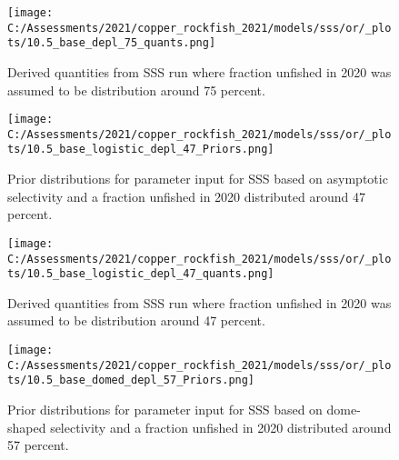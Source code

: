 \documentclass[11pt,
  english,
  a4paper,
]{article}
\begin{document}
\tagmcend\tagstructend

\newpage


\begin{figure}
\centering
\texttt{[image: C:/Assessments/2021/copper\_rockfish\_2021/models/sss/or/\_plots/10.5\_base\_depl\_75\_quants.png]}
\caption{Derived quantities from SSS run where fraction unfished in 2020 was assumed to be distribution around 75 percent.\label{fig:sss-quant-75}}
\end{figure}

\tagmcend\tagstructend

\newpage


\begin{figure}
\centering
\texttt{[image: C:/Assessments/2021/copper\_rockfish\_2021/models/sss/or/\_plots/10.5\_base\_logistic\_depl\_47\_Priors.png]}
\caption{Prior distributions for parameter input for SSS based on asymptotic selectivity and a fraction unfished in 2020 distributed around 47 percent.\label{fig:sss-prior-47}}
\end{figure}

\tagmcend\tagstructend

\newpage


\begin{figure}
\centering
\texttt{[image: C:/Assessments/2021/copper\_rockfish\_2021/models/sss/or/\_plots/10.5\_base\_logistic\_depl\_47\_quants.png]}
\caption{Derived quantities from SSS run where fraction unfished in 2020 was assumed to be distribution around 47 percent.\label{fig:sss-quant-47}}
\end{figure}

\tagmcend\tagstructend

\newpage


\begin{figure}
\centering
\texttt{[image: C:/Assessments/2021/copper\_rockfish\_2021/models/sss/or/\_plots/10.5\_base\_domed\_depl\_57\_Priors.png]}
\caption{Prior distributions for parameter input for SSS based on dome-shaped selectivity and a fraction unfished in 2020 distributed around 57 percent.\label{fig:sss-prior-57}}
\end{figure}
\end{document}
